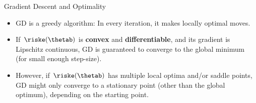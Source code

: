 \begin{vbframe}{Gradient Descent and Optimality}

\begin{minipage}{0.45\textwidth}
    \begin{small}
    \begin{itemize}
      \item GD is a greedy algorithm: In every iteration, it makes locally optimal moves.
      \vspace*{2mm}
      \item If $\riske(\thetab)$ is \textbf{convex} and \textbf{differentiable}, and its gradient is Lipschitz continuous, GD is guaranteed to converge to the global minimum (for small enough step-size).  
      \vspace*{2mm}
    \item However, if $\riske(\thetab)$ has multiple local optima and/or saddle points, GD might only converge to a stationary point (other than the global optimum), depending on the starting point. 
    \end{itemize}
    \end{small}
  \end{minipage}\hfill
  \begin{minipage}{0.5\textwidth}
    \begin{figure}
      \centering
    \end{figure}
  \end{minipage}  


\end{vbframe}
